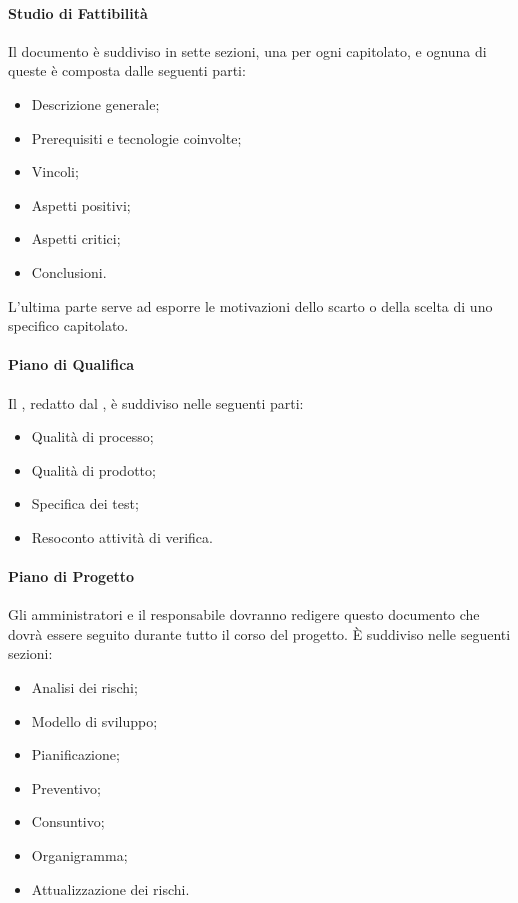 \paragraph{Studio di Fattibilità}
Il documento è suddiviso in sette sezioni, una per ogni capitolato, e ognuna di queste è composta dalle seguenti parti:
\begin{itemize}
    \item Descrizione generale;
    \item Prerequisiti e tecnologie coinvolte;
    \item Vincoli;
    \item Aspetti positivi;
    \item Aspetti critici;
    \item Conclusioni.
\end{itemize}
L'ultima parte serve ad esporre le motivazioni dello scarto o della scelta di uno specifico capitolato.
\paragraph{Piano di Qualifica} \label{pdq}
Il \PdQ{}, redatto dal , è suddiviso nelle seguenti parti:
\begin{itemize}
\item Qualità di processo;
\item Qualità di prodotto;
\item Specifica dei test;
\item Resoconto attività di verifica.
\end{itemize} 
\paragraph{Piano di Progetto} \label{pdp}
Gli amministratori e il responsabile dovranno redigere questo documento che dovrà essere seguito durante tutto il corso del progetto. È suddiviso nelle seguenti sezioni:
\begin{itemize}
    \item Analisi dei rischi;
    \item Modello di sviluppo;
    \item Pianificazione;  
    \item Preventivo;
    \item Consuntivo;
    \item Organigramma;
    \item Attualizzazione dei rischi. 
\end{itemize}

